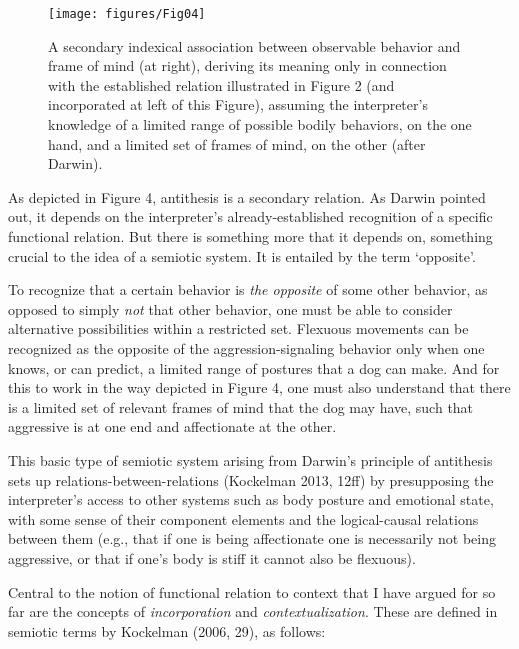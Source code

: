 \begin{figure}[h!]
\texttt{[image: figures/Fig04]}
\caption{A secondary indexical association between observable behavior 
and frame of mind (at right), deriving its meaning only in connection 
with the established relation illustrated in Figure 2 (and incorporated 
at left of this Figure), assuming the interpreter's knowledge of a 
limited range of possible bodily behaviors, on the one hand, and a 
limited set of frames of mind, on the other (after Darwin).}
\end{figure}

As depicted in Figure 4, antithesis is a secondary relation. As Darwin 
pointed out, it depends on the interpreter's already-established 
recognition of a specific functional relation. But there is something 
more that it depends on, something crucial to the idea of a semiotic 
system. It is entailed by the term \textquoteleft opposite'. 



To recognize that a certain behavior is \textit{the opposite} of some 
other behavior, as opposed to simply \textit{not} that other behavior, 
one must be able to consider alternative possibilities within a 
restricted set. Flexuous movements can be recognized as the opposite of 
the aggression-signaling behavior only when one knows, or can predict, a 
limited range of postures that a dog can make. And for this to work in 
the way depicted in Figure 4, one must also understand that there is a 
limited set of relevant frames of mind that the dog may have, such that 
aggressive is at one end and affectionate at the other. 



This basic type of semiotic system arising from Darwin's principle of 
antithesis sets up relations-between-relations (Kockelman 2013, 12ff) by 
presupposing the interpreter's access to other systems such as body 
posture and emotional state, with some sense of their component elements 
and the logical-causal relations between them (e.g., that if one is 
being affectionate one is necessarily not being aggressive, or that if 
one's body is stiff it cannot also be flexuous). 



Central to the notion of functional relation to context that I have 
argued for so far are the concepts of \textit{incorporation }and 
\textit{contextualization}. These are defined in semiotic terms by 
Kockelman (2006, 29), as follows:



